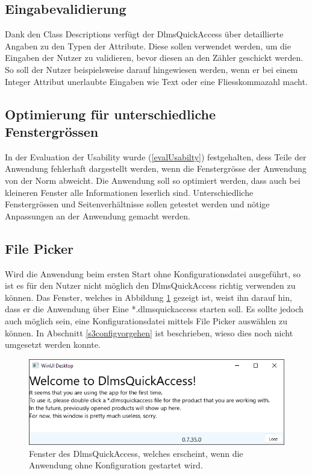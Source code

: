 \subsection{Eingabevalidierung}
Dank den Class Descriptions verfügt der DlmsQuickAccess über detaillierte Angaben zu den Typen der Attribute.
Diese sollen verwendet werden, um die Eingaben der Nutzer zu validieren, bevor diesen an den Zähler geschickt werden.
So soll der Nutzer beispielsweise darauf hingewiesen werden, wenn er bei einem Integer Attribut unerlaubte Eingaben wie Text oder eine Fliesskommazahl macht.

\subsection{Optimierung für unterschiedliche Fenstergrössen}
In der Evaluation der Usability wurde (\ref{evalUsabilty}) festgehalten, dess Teile der Anwendung fehlerhaft dargestellt werden, wenn die Fenstergrösse der Anwendung von der Norm abweicht.
Die Anwendung soll so optimiert werden, dass auch bei kleineren Fenster alle Informationen leserlich sind.
Unterschiedliche Fenstergrössen und Seitenverhältnisse sollen getestet werden und nötige Anpassungen an der Anwendung gemacht werden.

\subsection{File Picker}\label{ausblick:filePicker}
Wird die Anwendung beim ersten Start ohne Konfigurationsdatei ausgeführt, so ist es für den Nutzer nicht möglich den DlmsQuickAccess richtig verwenden zu können.
Das Fenster, welches in Abbildung \ref{fig:welcomeScreenEmpty} gezeigt ist, weist ihn darauf hin, dass er die Anwendung über Eine *.dlmsquickaccess starten soll.
Es sollte jedoch auch möglich sein, eine Konfigurationsdatei mittels File Picker auswählen zu können.
In Abschnitt \ref{s3configvorgehen} ist beschrieben, wieso dies noch nicht umgesetzt werden konnte.

\begin{figure}[H]
   \centering
   \includegraphics[width=1.0\textwidth]{gfx/welcomeScreenEmpty.png}
   \caption{
       Fenster des DlmsQuickAccess, welches erscheint, wenn die Anwendung ohne Konfiguration gestartet wird.
   }
   \label{fig:welcomeScreenEmpty}
\end{figure}

